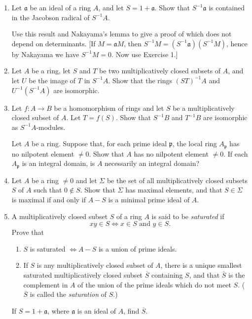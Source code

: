 \begin{enumerate}
\amstaritem Let $S$ be a multiplicatively closed subset of a ring $A$, and let $M$ be a finitely generated $A$-module. Prove that $S^{-1}M=0$ if and only if there exists $s\in S$ such that $sM=0$.

\item Let $\mathfrak a$ be an ideal of a ring $A$, and let $S=1+\mathfrak a$. Show that $S^{-1}\mathfrak a$ is contained in the Jacobson radical of $S^{-1}A$.

Use this result and Nakayama's lemma to give a proof of  which does not depend on determinants. [If $M=\mathfrak aM$, then $S^{-1}M=(S^{-1}\mathfrak a)(S^{-1}M)$, hence by Nakayama we have $S^{-1}M=0$. Now use Exercise 1.]

\item Let $A$ be a ring, let $S$ and $T$ be two multiplicatively closed subsets of $A$, and let $U$ be the image of $T$ in $S^{-1}A$. Show that the rings $(ST)^{-1}A$ and $U^{-1}(S^{-1}A)$ are isomorphic.

\item Let $f:A\longrightarrow B$ be a homomorphism of rings and let $S$ be a multiplicatively closed subset of $A$. Let $T=f(S)$. Show that $S^{-1}B$ and $T^{-1}B$ are isomorphic as $S^{-1}A$-modules.

\amstaritem Let $A$ be a ring. Suppose that, for each prime ideal $\mathfrak p$, the local ring $A_{\mathfrak p}$ has no nilpotent element $\neq0$. Show that $A$ has no nilpotent element $\neq0$. If each $A_{\mathfrak p}$ is an integral domain, is $A$ necessarily an integral domain?

\item Let $A$ be a ring $\neq0$ and let $\Sigma$ be the set of all multiplicatively closed subsets $S$ of $A$ such that $0\notin S$. Show that $\Sigma$ has maximal elements, and that $S\in\Sigma$ is maximal if and only if $A-S$ is a minimal prime ideal of $A$.

\item A multiplicatively closed subset $S$ of a ring $A$ is said to be \textit{saturated} if
\[
 xy\in S\Longleftrightarrow x\in S\text{ and }y\in S.
\]
Prove that
\begin{enumerate}
\renewcommand{\labelenumii}{\roman{enumii})}
\item $S$ is saturated $\Longleftrightarrow A-S$ is a union of prime ideals.
\item If $S$ is any multiplicatively closed subset of $A$, there is a unique smallest saturated multiplicatively closed subset $\overline S$ containing $S$, and that $\overline S$ is the complement in $A$ of the union of the prime ideals which do not meet $S$. ($\overline S$ is called the \textit{saturation} of $S$.)
\end{enumerate}
If $S=1+\mathfrak a$, where $\mathfrak a$ is an ideal of $A$, find $\overline S$.


\end{enumerate}
